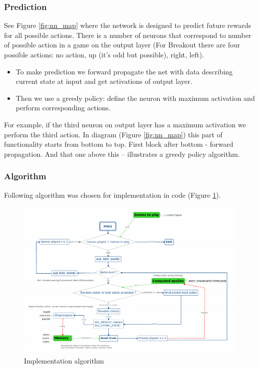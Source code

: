 \documentclass[a4paper,oneside,dvipsnames]{article}
\begin{document}
\subsubsection[Prediction]{Prediction}

See Figure \ref{fig:nn_map} where the network is designed to predict future rewards for all possible actions.
There is a number of neurons that correspond to number of possible action in a game on the output layer (For Breakout there are four possible actions: no action, up (it’s odd but possible),
right, left).
\begin{itemize}
\item To make prediction we forward propagate the net with data describing current state at input and get activations of output layer.
\item Then we use a greedy policy: define the neuron with maximum activation and perform corresponding actions.
\end{itemize}

For example, if the third neuron on output layer has a maximum activation we perform the third action.
In diagram (Figure \ref{fig:nn_map}) this part of functionality starts from bottom to top. First block after bottom - forward propagation. And that one above this – illustrates a greedy policy algorithm.

\subsubsection[Algorithm]{Algorithm}
Following algorithm was chosen for implementation in code (Figure \ref{fig:imp_algo}).
\begin{figure}[h]
    \centering
    \includegraphics[scale=0.38]{flow.png}
    \caption{Implementation algorithm}
    \label{fig:imp_algo}
\end{figure}
\end{document}
